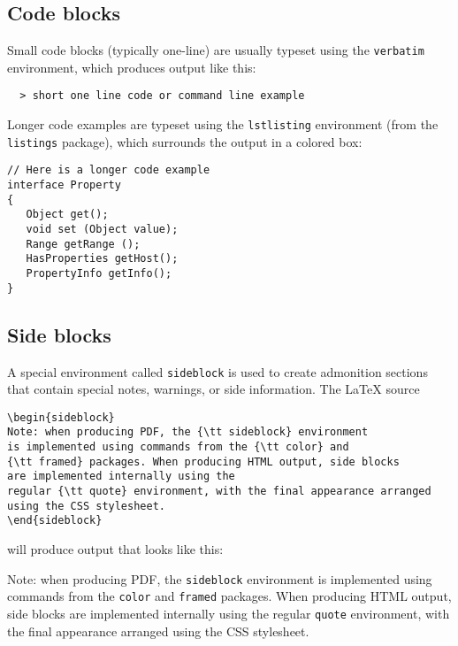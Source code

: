 \documentclass{article}
\begin{document}
\subsection{Code blocks}

Small code blocks (typically one-line) are usually typeset using the
{\tt verbatim} environment, which produces output like this:

\begin{verbatim}
  > short one line code or command line example
\end{verbatim}

Longer code examples are typeset using the {\tt lstlisting}
environment (from the {\tt listings} package), which surrounds
the output in a colored box:

\begin{lstlisting}[]
// Here is a longer code example
interface Property
{
   Object get(); 
   void set (Object value); 
   Range getRange ();
   HasProperties getHost();
   PropertyInfo getInfo();
}
\end{lstlisting}

\subsection{Side blocks}
\label{SideBlocksSec}

A special environment called {\tt sideblock} is used to create
admonition sections that contain special notes, warnings, or side
information. The LaTeX source

\begin{lstlisting}[]
\begin{sideblock}
Note: when producing PDF, the {\tt sideblock} environment
is implemented using commands from the {\tt color} and
{\tt framed} packages. When producing HTML output, side blocks
are implemented internally using the
regular {\tt quote} environment, with the final appearance arranged
using the CSS stylesheet. 
\end{sideblock}
\end{lstlisting}

will produce output that looks like this:

\begin{sideblock}
Note: when producing PDF, the {\tt sideblock} environment
is implemented using commands from the {\tt color} and
{\tt framed} packages. When producing HTML output, side blocks
are implemented internally using the
regular {\tt quote} environment, with the final appearance arranged
using the CSS stylesheet. 
\end{sideblock}
\end{document}
